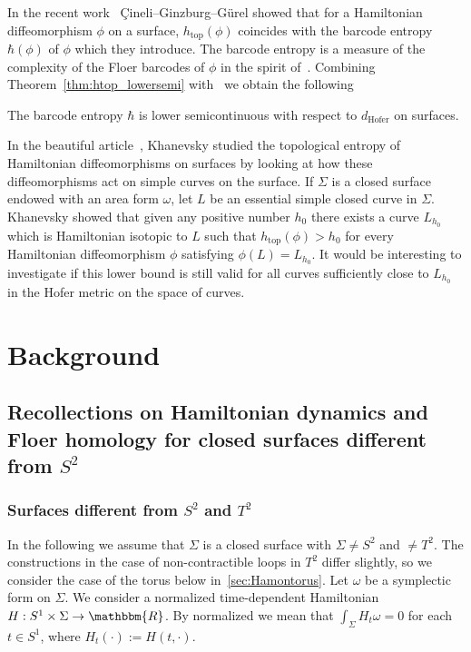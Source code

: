 \documentclass[AHL,Unicode,longabstracts,published]{cedram}
\newcommand{\R}{\mathbbm{R}}
\newcommand{\topo}{\mathrm{top}}
\newcommand{\hofer}{\mathrm{Hofer}}
\newcommand{\topo}{\mathrm{top}}
\newcommand{\hofer}{\mathrm{Hofer}}
\begin{document}
In the recent work~\cite{CGG} Çineli--Ginzburg--G\"urel showed that for a Hamiltonian diffeomorphism $\phi$ on a surface, $h_{\topo}(\phi)$ coincides with the barcode entropy $\hbar(\phi)$ of $\phi$ which they introduce. The barcode entropy is a measure of the complexity of the Floer barcodes of $\phi$ in the spirit of~\cite{leonidpersistence}. Combining Theorem~\ref{thm:htop_lowersemi} with~\cite[Theorem~C]{CGG} we obtain the following

\begin{coro}
The barcode entropy $\hbar$ is lower semicontinuous with respect to $d_{\hofer}$ on surfaces.
\end{coro}

In the beautiful article~\cite{Khanevsky}, Khanevsky studied the topological entropy of Hamiltonian diffeomorphisms on surfaces by looking at how these diffeomorphisms act on simple curves on the surface. If $\Sigma$ is a closed surface endowed with an area form $\omega$, let $L$ be an essential simple closed curve in $\Sigma$. Khanevsky showed that given any positive number $h_0$ there exists a curve $L_{h_0}$ which is Hamiltonian isotopic to $L$ such that $h_{\topo}(\phi) > h_0$ for every Hamiltonian diffeomorphism $\phi$ satisfying $\phi(L)= L_{h_0}$. It would be interesting to investigate if this lower bound is still valid for all curves sufficiently close to $L_{h_0}$ in the Hofer metric on the space of curves.

\section{Background}


\subsection{Recollections on Hamiltonian dynamics and Floer homology for closed surfaces different from \texorpdfstring{$S^2$}{S2}} \label{sec:Hamonclosedsurfaces}

\subsubsection{Surfaces different from \texorpdfstring{$S^2$}{S2} and \texorpdfstring{$T^2$}{T2}}\label{sec:Hamonhighergenus}

In the following we assume that $\Sigma$ is a closed surface with $\Sigma \neq S^2$ and $\neq T^2$. The constructions in the case of non-contractible loops in $T^2$ differ slightly, so we consider the case of the torus below in~\ref{sec:Hamontorus}. Let $\omega$ be a symplectic form on $\Sigma$. We consider a normalized time-dependent Hamiltonian $H:S^1 \times \Sigma \to \R$. By normalized we mean that $\int_\Sigma H_t\omega=0$ for each $t\in S^1$, where $H_t(\cdot):= H(t,\cdot)$.
\end{document}
